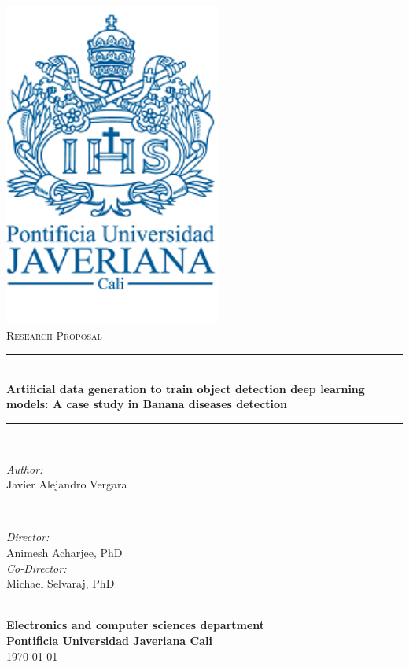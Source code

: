 \documentclass[11pt, openright]{Thesis}      %
\begin{document}
\frontmatter	  %

\begin{titlepage}

\newcommand{\HRule}{\rule{\linewidth}{0.5mm}} 

\center 

\includegraphics[scale=0.7]{Figures/logo_javeriana.pdf}\\[1cm] 

\textsc{\Large Research Proposal}\\[0.5cm] 

\HRule \\[0.4cm]
{ \huge \bfseries Artificial data generation to train object detection deep learning models: A case study in Banana diseases detection}\\[0.4cm] 
\HRule \\[1.5cm]

\begin{minipage}{0.4\textwidth}
\begin{flushleft} \large
\emph{Author:}\\
Javier Alejandro Vergara
\end{flushleft}
\end{minipage}
~
\begin{minipage}{0.4\textwidth}
\begin{flushright} \large
\emph{Director:} \\
Animesh Acharjee, PhD\\ 
\emph{Co-Director:} \\
Michael Selvaraj, PhD 
\end{flushright}

\end{minipage}\\[2cm]
\textbf{ Electronics and computer sciences
department}\\
\textbf{Pontificia Universidad Javeriana Cali}
\\
\vspace{5mm} %
{\large \today}\\[2cm] 

\vfill 

\end{titlepage}
\end{document}

